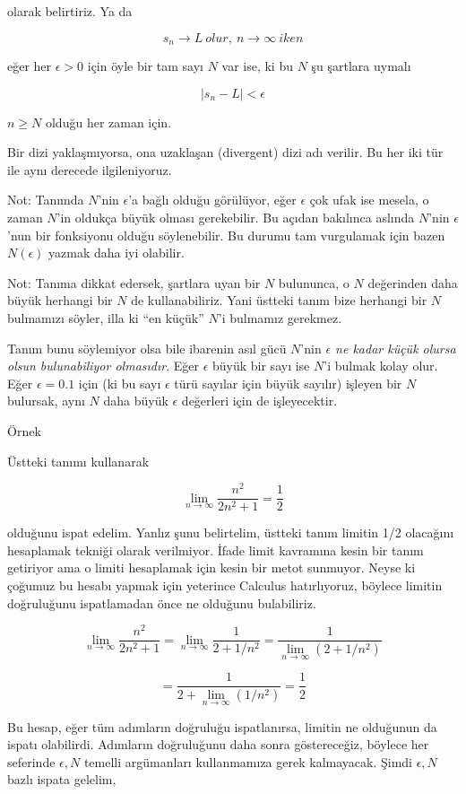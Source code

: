 \documentclass[12pt,fleqn]{article}\usepackage{../../common}
\begin{document}
olarak belirtiriz. Ya da

$$ s_n \to L \ olur, \ n \to \infty \ iken $$

eğer her $\epsilon > 0$ için öyle bir tam sayı $N$ var ise, ki bu $N$ şu
şartlara uymalı

$$ |s_n - L| < \epsilon  $$

$n \ge N$ olduğu her zaman için. 

Bir dizi yaklaşmıyorsa, ona uzaklaşan (divergent) dizi adı verilir. Bu her
iki tür ile aynı derecede ilgileniyoruz. 

Not: Tanımda $N$'nin $\epsilon$'a bağlı olduğu görülüyor, eğer $\epsilon$
çok ufak ise mesela, o zaman $N$'in oldukça büyük olması
gerekebilir. Bu açıdan bakılınca aslında $N$'nin $\epsilon$'nun bir
fonksiyonu olduğu söylenebilir. Bu durumu tam vurgulamak için bazen
$N(\epsilon)$ yazmak daha iyi olabilir. 

Not: Tanıma dikkat edersek, şartlara uyan bir $N$ bulununca, o $N$
değerinden daha büyük herhangi bir $N$ de kullanabiliriz. Yani üstteki
tanım bize herhangi bir $N$ bulmamızı söyler, illa ki ``en küçük'' $N$'i
bulmamız gerekmez. 

Tanım bunu söylemiyor olsa bile ibarenin asıl gücü $N$'nin {\em $\epsilon$
  ne kadar küçük olursa olsun bulunabiliyor olmasıdır}. Eğer $\epsilon$
büyük bir sayı ise $N$'i bulmak kolay olur. Eğer $\epsilon = 0.1$ için (ki
bu sayı $\epsilon$ türü sayılar için büyük sayılır) işleyen bir $N$
bulursak, aynı $N$ daha büyük  $\epsilon$ değerleri için de işleyecektir. 

Örnek 

Üstteki tanımı kullanarak 

$$ \lim_{n \to \infty } \frac{n^2}{2n^2 + 1} = \frac{1}{2} $$

olduğunu ispat edelim. Yanlız şunu belirtelim, üstteki tanım limitin 1/2
olacağını hesaplamak tekniği olarak verilmiyor. İfade limit kavramına kesin
bir tanım getiriyor ama o limiti hesaplamak için kesin bir metot
sunmuyor. Neyse ki çoğumuz bu hesabı yapmak için yeterince Calculus
hatırlıyoruz, böylece limitin doğruluğunu ispatlamadan önce ne olduğunu
bulabiliriz.

$$ \lim_{n \to \infty } \frac{n^2}{2n^2 + 1}  =
\lim_{n \to \infty } \frac{1}{2 + 1/n^2} =
\frac{1}{\lim_{n \to \infty }(2 + 1/n^2)} 
$$

$$ = \frac{1}{2 + \lim_{n \to \infty }(1/n^2)}  = \frac{1}{2} $$

Bu hesap, eğer tüm adımların doğruluğu ispatlanırsa, limitin ne olduğunun
da ispatı olabilirdi. Adımların doğruluğunu daha sonra göstereceğiz,
böylece her seferinde $\epsilon,N$ temelli argümanları kullanmamıza gerek
kalmayacak. Şimdi  $\epsilon,N$ bazlı ispata gelelim, 
\end{document}
